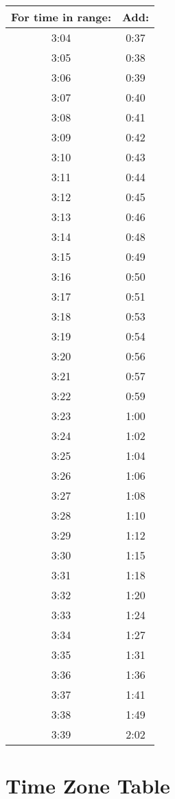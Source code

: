 		\begin{minipage}{0.5\textwidth}\begin{tabular}[t]{c|c}
	For time in range: & Add: \\\hline
	3:04 & 0:37 \\\hline
					3:05 & 0:38 \\\hline
						3:06 & 0:39 \\\hline
					3:07 & 0:40 \\\hline
					3:08 & 0:41 \\\hline
					3:09 & 0:42 \\\hline
	3:10 & 0:43 \\\hline
	3:11 & 0:44 \\\hline
	3:12 & 0:45 \\\hline
	3:13 & 0:46 \\\hline
	3:14 & 0:48 \\\hline
	3:15 & 0:49 \\\hline
	3:16 & 0:50 \\\hline
	3:17 & 0:51 \\\hline
	3:18 & 0:53 \\\hline
	3:19 & 0:54 \\\hline
	3:20 & 0:56 \\\hline
	3:21 & 0:57 \\\hline
	3:22 & 0:59 \\\hline
	3:23 & 1:00 \\\hline
	3:24 & 1:02 \\\hline
	3:25 & 1:04 \\\hline
	3:26 & 1:06 \\\hline
	3:27 & 1:08 \\\hline
	3:28 & 1:10 \\\hline
	3:29 & 1:12 \\\hline
	3:30 & 1:15 \\\hline
	3:31 & 1:18 \\\hline
	3:32 & 1:20 \\\hline
	3:33 & 1:24 \\\hline
	3:34 & 1:27 \\\hline
	3:35 & 1:31 \\\hline
	3:36 & 1:36 \\\hline
	3:37 & 1:41 \\\hline
	3:38 & 1:49 \\\hline
	3:39 & 2:02
\end{tabular}\end{minipage}\newpage

\section{Time Zone Table}

